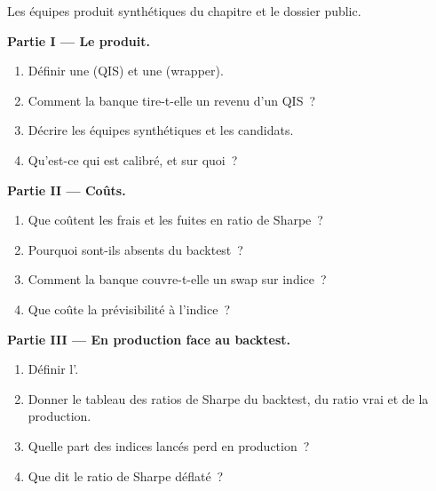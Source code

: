 \begin{problem}\label{pb:s2:quantitative-investment-strategies:1}
Les équipes produit synthétiques du chapitre et le dossier public.

\medskip\noindent\textbf{Partie I --- Le produit.}
\begin{enumerate}
\item Définir une  (QIS) et une  (wrapper).
\item Comment la banque tire-t-elle un revenu d'un QIS~?
\item Décrire les équipes synthétiques et les candidats.
\item Qu'est-ce qui est calibré, et sur quoi~?
\end{enumerate}

\medskip\noindent\textbf{Partie II --- Coûts.}
\begin{enumerate}[resume]
\item Que coûtent les frais et les fuites en ratio de Sharpe~?
\item Pourquoi sont-ils absents du backtest~?
\item Comment la banque couvre-t-elle un swap sur indice~?
\item Que coûte la prévisibilité à l'indice~?
\end{enumerate}

\medskip\noindent\textbf{Partie III --- En production face au backtest.}
\begin{enumerate}[resume]
\item Définir l'.
\item Donner le tableau des ratios de Sharpe du backtest, du ratio vrai et de la production.
\item Quelle part des indices lancés perd en production~?
\item Que dit le ratio de Sharpe déflaté~?
\end{enumerate}


\end{problem}
